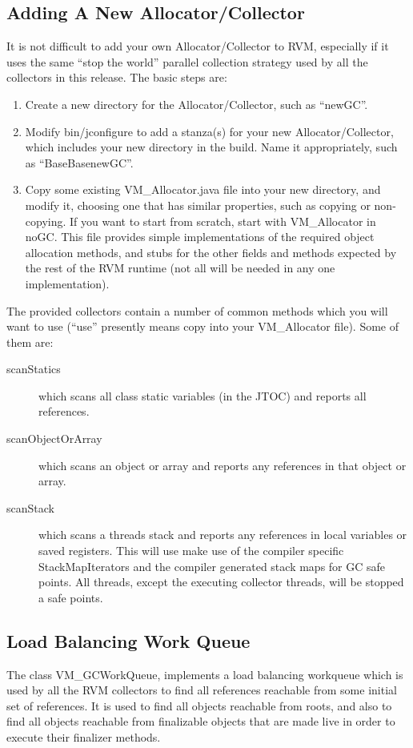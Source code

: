 \subsection{Adding A New Allocator/Collector} \label{sssec:newalloc}
It is not difficult to add your own Allocator/Collector to RVM,
especially if it uses the same ``stop the world'' parallel collection
strategy used by all the collectors in this release.  The basic steps
are:
\begin{enumerate}
\item Create a new directory for the Allocator/Collector, such as ``newGC''.
\item Modify bin/jconfigure to add a stanza(s) for your new Allocator/Collector,
which includes your new directory in the build.  Name it appropriately, such as
``BaseBasenewGC''.
\item Copy some existing VM\_Allocator.java file into your new directory,
and modify it, choosing one that has similar properties, such as copying or
non-copying.  If you want to start from scratch, start with VM\_Allocator in noGC.
This file provides simple implementations of the required object allocation
methods, and stubs for the other fields and methods expected by the rest
of the RVM runtime (not all will be needed in any one implementation).
\end{enumerate}

The provided collectors contain a number of common methods which you
will want to use (``use'' presently means copy into your VM\_Allocator file).
Some of them are:
\begin{description}
\item[scanStatics] which scans all class static variables (in the JTOC) and
reports all references.
\item[scanObjectOrArray] which scans an object or array and reports any references
in that object or array.
\item[scanStack] which scans a threads stack and reports any references in
local variables or saved registers.  This will use make use of the compiler
specific StackMapIterators and the compiler generated stack maps for GC safe points.
All threads, except the executing collector threads, will be stopped a safe points.
\end{description}

\subsection{Load Balancing Work Queue} \label{sssec:workqueue}
The class VM\_GCWorkQueue, implements a load balancing workqueue
which is used by all the RVM collectors to find all references reachable from
some initial set of references.  It is used to find all objects reachable
from roots, and also to find all objects reachable from finalizable objects
that are made live in order to execute their finalizer methods.

